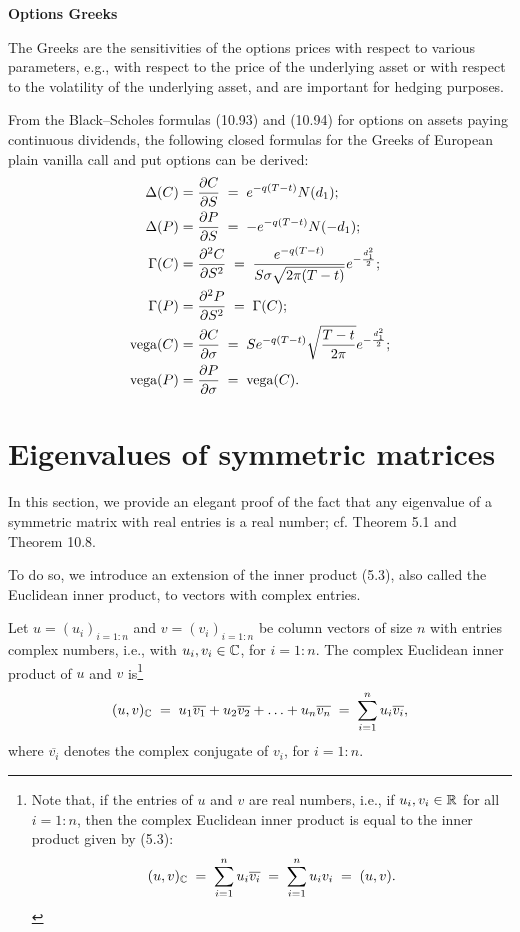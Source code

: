 \medskip
\noindent\textbf{Options Greeks}

The Greeks are the sensitivities of the options prices with respect to various
parameters, e.g., with respect to the price of the underlying asset or with respect
to the volatility of the underlying asset, and are important for hedging purposes.

From the Black--Scholes formulas (10.93) and (10.94) for options on assets paying
continuous dividends, the following closed formulas for the Greeks of European plain
vanilla call and put options can be derived:
\begin{align}
\Delta(C) &= \frac{\partial C}{\partial S} \;=\; e^{-q(T-t)}N(d_1); \\
\Delta(P) &= \frac{\partial P}{\partial S} \;=\; -e^{-q(T-t)}N(-d_1); \\
\Gamma(C) &= \frac{\partial^{2} C}{\partial S^{2}} \;=\; \frac{e^{-q(T-t)}}{S\sigma\sqrt{2\pi(T-t)}}
e^{-\frac{d_1^2}{2}}; \\
\Gamma(P) &= \frac{\partial^{2} P}{\partial S^{2}} \;=\; \Gamma(C); \\
\text{vega}(C) &= \frac{\partial C}{\partial \sigma} \;=\; Se^{-q(T-t)}\sqrt{\frac{T-t}{2\pi}}
e^{-\frac{d_1^2}{2}}; \\
\text{vega}(P) &= \frac{\partial P}{\partial \sigma} \;=\; \text{vega}(C).
\end{align}

\section{Eigenvalues of symmetric matrices}

In this section, we provide an elegant proof of the fact that any eigenvalue of a
symmetric matrix with real entries is a real number; cf. Theorem 5.1 and Theorem
10.8.

To do so, we introduce an extension of the inner product (5.3), also called the
Euclidean inner product, to vectors with complex entries.

\begin{definition}
Let $u = (u_i)_{i=1:n}$ and $v = (v_i)_{i=1:n}$ be column vectors of size $n$ with
entries complex numbers, i.e., with $u_i,v_i \in \mathbb{C}$, for $i = 1:n$. The complex
Euclidean inner product of $u$ and $v$ is\footnote{Note that, if the entries of $u$
and $v$ are real numbers, i.e., if $u_i,v_i \in \mathbb{R}$ for all $i = 1:n$, then the
complex Euclidean inner product is equal to the inner product given by (5.3):
\[
(u,v)_{\mathbb{C}} \;=\; \sum_{i=1}^n u_i\overline{v_i} \;=\; \sum_{i=1}^n u_iv_i \;=\;
(u,v).
\]}
\begin{equation}
(u,v)_{\mathbb{C}} \;=\; u_1\overline{v_1} + u_2\overline{v_2} + \ldots + u_n\overline{v_n}
\;=\; \sum_{i=1}^n u_i\overline{v_i},
\end{equation}
where $\overline{v_i}$ denotes the complex conjugate of $v_i$, for $i = 1:n$.
\end{definition}

